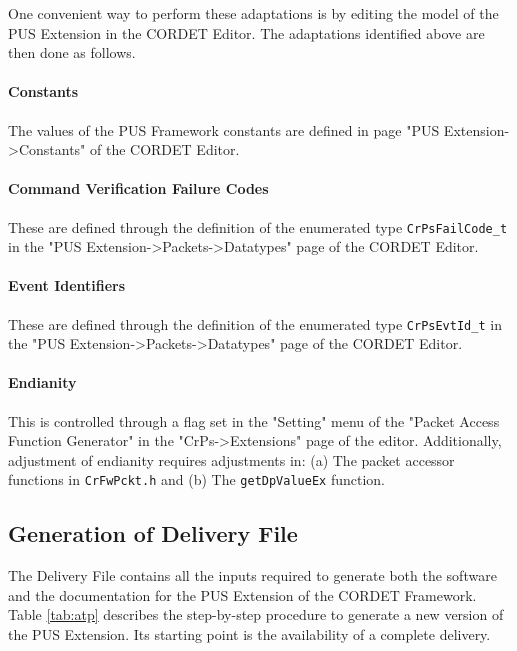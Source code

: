 \documentclass{pnp_article}
\begin{document}
One convenient way to perform these adaptations is by editing the model of the PUS Extension in the CORDET Editor. The adaptations identified above are then done as follows.

\paragraph{Constants}
The values of the PUS Framework constants are defined in page "PUS Extension->Constants" of the CORDET Editor.

\paragraph{Command Verification Failure Codes}
These are defined through the definition of the enumerated type \texttt{CrPsFailCode\_t} in the "PUS Extension->Packets->Datatypes" page of the CORDET Editor.

\paragraph{Event Identifiers}
These are defined through the definition of the enumerated type \texttt{CrPsEvtId\_t} in the "PUS Extension->Packets->Datatypes" page of the CORDET Editor.

\paragraph{Endianity}
This is controlled through a flag set in the "Setting" menu of the "Packet Access Function Generator" in the "CrPs->Extensions" page of the editor. Additionally, adjustment of endianity requires adjustments in: (a) The packet accessor functions in \texttt{CrFwPckt.h} and (b) The \texttt{getDpValueEx} function.


\subsection{Generation of Delivery File}\label{sec:atp}
The Delivery File contains all the inputs required to generate both the software and the documentation for the PUS Extension of the CORDET Framework. Table \ref{tab:atp} describes the step-by-step procedure to generate a new version of the PUS Extension. Its starting point is the availability of a complete delivery. 
\end{document}
